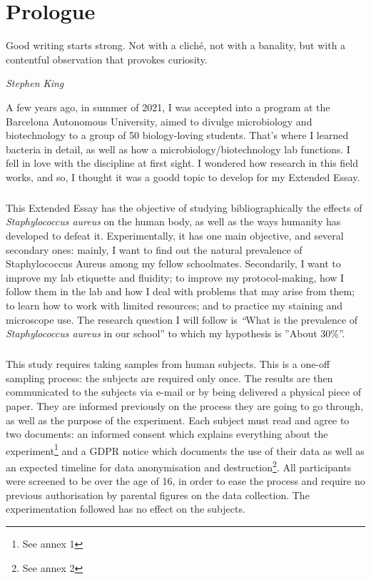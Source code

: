 \chapter{Prologue}
\epigraph{Good writing starts strong. Not with a cliché, not with a banality, but with a contentful observation that provokes curiosity.}{\textit{Stephen King}}
A few years ago, in summer of 2021, I was accepted into a program at the Barcelona Autonomous University, aimed to divulge microbiology and biotechnology to a group of 50 biology-loving students. That's where I learned bacteria in detail, as well as how a microbiology/biotechnology lab functions. I fell in love with the discipline at first sight. I wondered how research in this field works, and so, I thought it was a goodd topic to develop for my Extended Essay.

\paragraph{}This Extended Essay has the objective of studying bibliographically the effects of \emph{Staphylococcus aureus} on the human body, as well as the ways humanity has developed to defeat it. Experimentally, it has one main objective, and several secondary ones: mainly, I want to find out the natural prevalence of Staphylococcus Aureus among my fellow schoolmates. Secondarily, I want to improve my lab etiquette and fluidity; to improve my protocol-making, how I follow them in the lab and how I deal with problems that may arise from them; to learn how to work with limited resources; and to practice my staining and microscope use. The research question I will follow is \emph“What is the prevalence of \emph{Staphylococcus aureus} in our school” to which my hypothesis is ”About 30\%”. 

\paragraph{}This study requires taking samples from  human subjects. This is a one-off sampling process: the subjects are required only once. The results are then communicated to the subjects via e-mail or by being delivered a physical piece of paper. They are informed previously on the process they are going to go through, as well as the purpose of the experiment. Each subject must read and agree to two documents: an informed consent which explains everything about the experiment\footnote{See annex 1} and a GDPR notice which documents the use of their data as well as an expected timeline for data anonymisation and destruction\footnote{See annex 2}. All participants were screened to be over the age of 16, in order to ease the process and require no previous authorisation by parental figures on the data collection. The experimentation followed has no effect on the subjects\cite{WhatGDPREU2018}.
